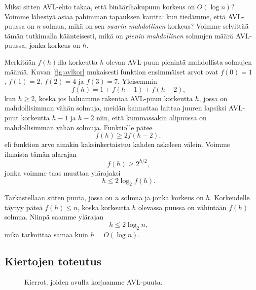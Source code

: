 Miksi sitten AVL-ehto takaa, että binäärihakupuun korkeus
on $O(\log n)$?
Voimme lähestyä asiaa pahimman tapauksen kautta:
kun tiedämme, että AVL-puussa on $n$ solmua,
mikä on sen \emph{suurin mahdollinen} korkeus?
Voimme selvittää tämän tutkimalla käänteisesti,
mikä on \emph{pienin mahdollinen} solmujen määrä
AVL-puussa, jonka korkeus on $h$.

Merkitään $f(h)$:lla korkeutta $h$ olevan AVL-puun
pienintä mahdollista solmujen määrää.
Kuvan \ref{fig:avlkor} mukaisesti funktion ensimmäiset arvot
ovat $f(0)=1$, $f(1)=2$, $f(2)=4$ ja $f(3)=7$.
Yleisemmin
\[f(h)=1+f(h-1)+f(h-2),\]
kun $h \ge 2$, koska jos haluamme rakentaa AVL-puun korkeutta $h$,
jossa on mahdollisimman vähän solmuja,
meidän kannattaa laittaa juuren lapsiksi AVL-puut
korkeutta $h-1$ ja $h-2$ niin,
että kummassakin alipuussa on mahdollisimman vähän solmuja.
Funktiolle pätee
\[f(h) \ge 2 f(h-2),\]
eli funktion arvo ainakin kaksinkertaistuu kahden askeleen välein.
Voimme ilmaista tämän alarajan
\[f(h) \ge 2^{h/2},\]
jonka voimme taas muuttaa ylärajaksi
\[ h \le 2 \log_2 f(h).\]

Tarkastellaan sitten puuta, jossa on $n$ solmua
ja jonka korkeus on $h$.
Korkeudelle täytyy päteä $f(h) \le n$,
koska korkeutta $h$ olevassa puussa on vähintään $f(h)$ solmua.
Niinpä saamme ylärajan
\[h \le 2 \log_2 n,\]
mikä tarkoittaa samaa kuin $h = O(\log n)$.

\subsection{Kiertojen toteutus}

\begin{figure}
\center
{}
\caption{Kierrot, joiden avulla korjaamme AVL-puuta.}
\label{fig:avlkie}
\end{figure}

